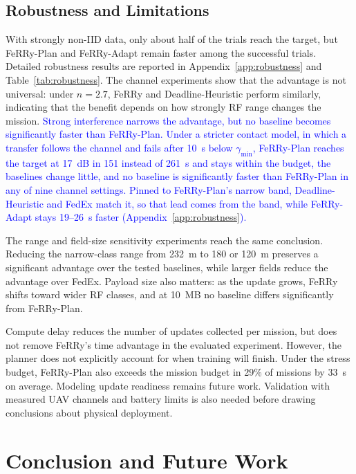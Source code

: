 \documentclass[conference]{IEEEtran}
\newcommand{\sysname}{FeRRy}
\begin{document}
\subsection{Robustness and Limitations}
\label{sec:robustness}
With strongly non-IID data, only about half of the trials reach the target, but
\sysname{}-Plan and \sysname{}-Adapt remain faster among the successful trials. Detailed robustness results are reported in
Appendix~\ref{app:robustness} and Table~\ref{tab:robustness}.
The channel experiments show that the advantage is not universal: under
\(n=2.7\), \sysname{} and Deadline-Heuristic perform similarly, indicating
that the benefit depends on how strongly RF range changes the mission.
\textcolor{blue}{Strong interference narrows the advantage, but no baseline becomes
significantly faster than \sysname{}-Plan. Under a stricter contact model, in
which a transfer follows the channel and fails after 10~s below
$\gamma_{\min}$, \sysname{}-Plan reaches the target at 17~dB in 151 instead of
261~s and stays within the budget, the baselines change little, and no baseline
is significantly faster than \sysname{}-Plan in any of nine channel settings.
Pinned to \sysname{}-Plan's narrow band, Deadline-Heuristic and FedEx match it,
so that lead comes from the band, while \sysname{}-Adapt stays 19--26~s faster
(Appendix~\ref{app:robustness}).}

The range and field-size sensitivity experiments reach the same conclusion.
Reducing the narrow-class range from 232~m to 180 or 120~m preserves a
significant advantage over the tested baselines, while larger fields reduce the
advantage over FedEx. Payload size also matters: as the update grows,
\sysname{} shifts toward wider RF classes, and at 10~MB no baseline differs
significantly from \sysname{}-Plan.

Compute delay reduces the number of updates collected per mission, but does not
remove \sysname{}'s time advantage in the evaluated experiment. However, the
planner does not explicitly account for when training will finish. Under the
stress budget, \sysname{}-Plan also exceeds the mission budget in 29\% of
missions by 33~s on average. Modeling update readiness remains future work.
Validation with measured UAV channels and battery limits is also needed before
drawing conclusions about physical deployment.
\section{Conclusion and Future Work}
\label{sec:conclusion}
\end{document}
